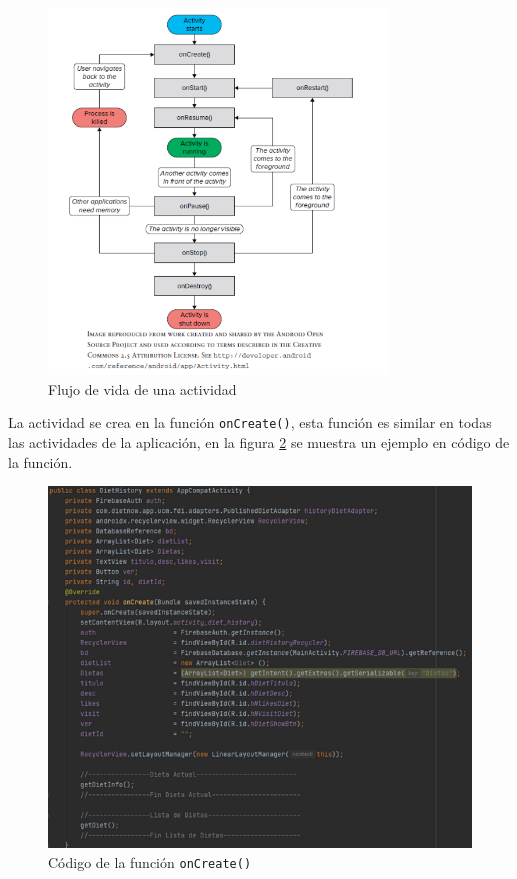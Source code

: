 \begin{figure}[H]
    \centering
    \includegraphics[width=0.8\textwidth]{Images/Capitulo7/flujo_vida_actividad.png}
    \caption{Flujo de vida de una actividad}
    \label{fig:flujo_vida_actividad}
\end{figure}

La actividad se crea en la función \texttt{onCreate()}, esta función es similar en todas las actividades de la aplicación, en la figura \ref{fig:oncreate} se muestra un ejemplo en código de la función.

\begin{figure}[H]
    \centering
    \includegraphics[width=\textwidth]{Images/Capitulo7/oncreate.png}
        \caption{Código de la función \texttt{onCreate()}}
    \label{fig:oncreate}
\end{figure}

